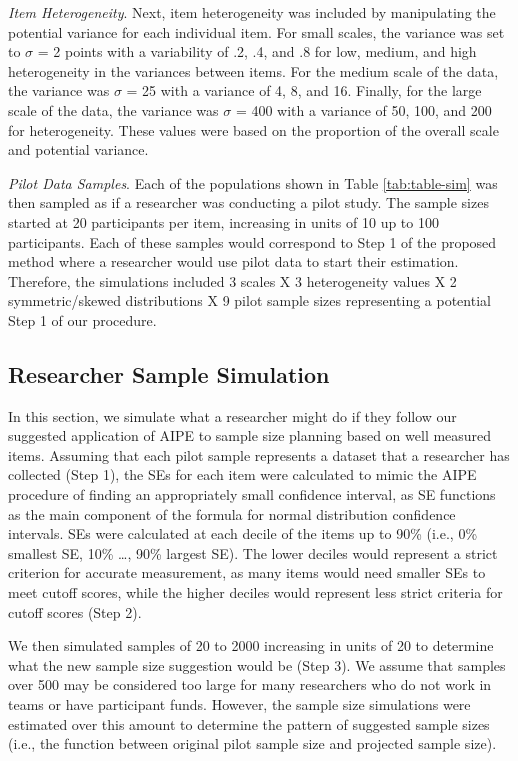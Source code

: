 \documentclass[
  man]{apa7}
\begin{document}
\emph{Item Heterogeneity}. Next, item heterogeneity was included by manipulating the potential variance for each individual item. For small scales, the variance was set to \(\sigma\) = 2 points with a variability of .2, .4, and .8 for low, medium, and high heterogeneity in the variances between items. For the medium scale of the data, the variance was \(\sigma\) = 25 with a variance of 4, 8, and 16. Finally, for the large scale of the data, the variance was \(\sigma\) = 400 with a variance of 50, 100, and 200 for heterogeneity. These values were based on the proportion of the overall scale and potential variance.

\emph{Pilot Data Samples}. Each of the populations shown in Table \ref{tab:table-sim} was then sampled as if a researcher was conducting a pilot study. The sample sizes started at 20 participants per item, increasing in units of 10 up to 100 participants. Each of these samples would correspond to Step 1 of the proposed method where a researcher would use pilot data to start their estimation. Therefore, the simulations included 3 scales X 3 heterogeneity values X 2 symmetric/skewed distributions X 9 pilot sample sizes representing a potential Step 1 of our procedure.

\subsection{Researcher Sample Simulation}\label{researcher-sample-simulation}

In this section, we simulate what a researcher might do if they follow our suggested application of AIPE to sample size planning based on well measured items. Assuming that each pilot sample represents a dataset that a researcher has collected (Step 1), the SEs for each item were calculated to mimic the AIPE procedure of finding an appropriately small confidence interval, as SE functions as the main component of the formula for normal distribution confidence intervals. SEs were calculated at each decile of the items up to 90\% (i.e., 0\% smallest SE, 10\% \ldots, 90\% largest SE). The lower deciles would represent a strict criterion for accurate measurement, as many items would need smaller SEs to meet cutoff scores, while the higher deciles would represent less strict criteria for cutoff scores (Step 2).

We then simulated samples of 20 to 2000 increasing in units of 20 to determine what the new sample size suggestion would be (Step 3). We assume that samples over 500 may be considered too large for many researchers who do not work in teams or have participant funds. However, the sample size simulations were estimated over this amount to determine the pattern of suggested sample sizes (i.e., the function between original pilot sample size and projected sample size).
\end{document}
